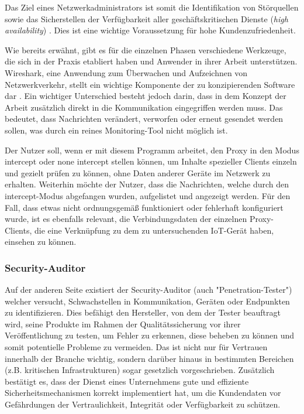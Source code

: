     Das Ziel eines Netzwerkadministrators ist somit die Identifikation von Störquellen sowie das Sicherstellen der Verfügbarkeit aller geschäftskritischen Dienste (\emph{high availability}) \cite{burgess2004principles}. Dies ist eine wichtige Voraussetzung für hohe Kundenzufriedenheit.
    
    Wie bereits erwähnt, gibt es für die einzelnen Phasen verschiedene Werkzeuge, die sich in der Praxis etabliert haben und Anwender in ihrer Arbeit unterstützen.
    Wireshark, eine Anwendung zum Überwachen und Aufzeichnen von Netzwerkverkehr, stellt ein wichtige Komponente der zu konzipierenden Software dar \cite{SandersChris2017Ppa}. Ein wichtiger Unterschied besteht jedoch darin, dass in dem Konzept der Arbeit zusätzlich direkt in die Kommunikation eingegriffen werden muss. Das bedeutet, dass Nachrichten verändert, verworfen oder erneut gesendet werden sollen, was durch ein reines Monitoring-Tool nicht möglich ist.
    
    Der Nutzer soll, wenn er mit diesem Programm arbeitet, den Proxy in den Modus \glqq intercept\grqq{} oder \glqq none intercept\grqq{} stellen können, um Inhalte spezieller Clients einzeln und gezielt prüfen zu können, ohne Daten anderer Geräte im Netzwerk zu erhalten.
    Weiterhin möchte der Nutzer, dass die Nachrichten, welche durch den \glqq intercept\grqq{}-Modus abgefangen wurden, aufgelistet und angezeigt werden.
    Für den Fall, dass etwas nicht ordnungsgemäß funktioniert oder fehlerhaft konfiguriert wurde, ist es ebenfalls relevant, die Verbindungsdaten der einzelnen Proxy-Clients, die eine Verknüpfung zu dem zu untersuchenden \acs{IoT}-Gerät haben, einsehen zu können.
    
\subsubsection{Security-Auditor}
    Auf der anderen Seite existiert der Security-Auditor (auch "Penetration-Tester") welcher versucht, Schwachstellen in Kommunikation, Geräten oder Endpunkten zu identifizieren.
    Dies befähigt den Hersteller, von dem der Tester beauftragt wird, seine Produkte im Rahmen der Qualitätssicherung vor ihrer Veröffentlichung zu testen, um Fehler zu erkennen, diese beheben zu können und somit potentielle Probleme zu vermeiden. Das ist nicht nur für Vertrauen innerhalb der Branche wichtig, sondern darüber hinaus in bestimmten Bereichen (z.B. kritischen Infrastrukturen) sogar gesetzlich vorgeschrieben.
    Zusätzlich bestätigt es, dass der Dienst eines Unternehmens gute und effiziente Sicherheitsmechanismen korrekt implementiert hat, um die Kundendaten vor Gefährdungen der Vertraulichkeit, Integrität oder Verfügbarkeit zu schützen.
    
